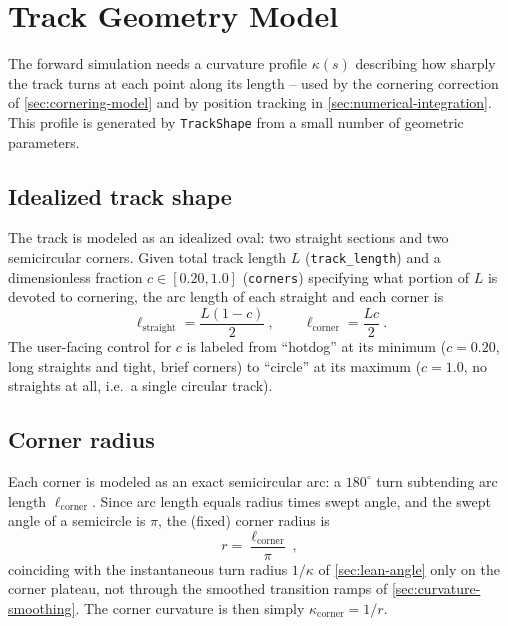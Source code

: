 \section{Track Geometry Model}
\label{sec:track-geometry}

The forward simulation needs a curvature profile $\kappa(s)$ describing how
sharply the track turns at each point along its length -- used by the
cornering correction of \cref{sec:cornering-model} and by position tracking
in \cref{sec:numerical-integration}. This profile is generated by
\nolinkurl{TrackShape} from a small number of geometric parameters.

\subsection{Idealized track shape}
\label{sec:idealized-shape}

The track is modeled as an idealized oval: two straight sections and two
semicircular corners. Given total
track length $L$ (\nolinkurl{track_length}) and a dimensionless fraction
$c \in [0.20, 1.0]$ (\nolinkurl{corners}) specifying what portion of $L$ is
devoted to cornering, the arc length of each straight and each corner is
\begin{equation}
    \ell_{\mathrm{straight}} = \frac{L(1-c)}{2}\ , \qquad
    \ell_{\mathrm{corner}} = \frac{Lc}{2}\ .
    \label{eq:straight-corner-length}
\end{equation}
The user-facing control for $c$ is labeled from \enquote{hotdog} at its minimum
($c=0.20$, long straights and tight, brief corners) to \enquote{circle} at its
maximum ($c=1.0$, no straights at all, i.e.\ a single circular track).

\subsection{Corner radius}
\label{sec:corner-radius}

Each corner is modeled as an exact semicircular arc: a $180^\circ$ turn subtending
arc length $\ell_{\mathrm{corner}}$. Since arc length equals radius times swept
angle, and the swept angle of a semicircle is $\pi$, the (fixed) corner radius
is
\begin{equation}
    r = \frac{\ell_{\mathrm{corner}}}{\pi}\ ,
    \label{eq:corner-radius}
\end{equation}
coinciding with the instantaneous turn radius $1/\kappa$ of \cref{sec:lean-angle}
only on the corner plateau, not through the smoothed transition ramps of
\cref{sec:curvature-smoothing}. The corner curvature is then simply
$\kappa_{\mathrm{corner}} = 1/r$.

